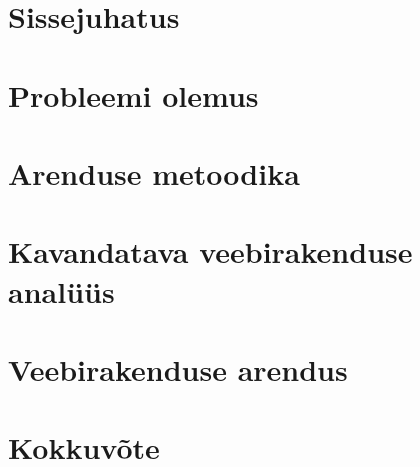 \chapter{Sissejuhatus}\label{chapter:introduction}


\chapter{Probleemi olemus}\label{chapter:problem_nature}


\chapter{Arenduse metoodika}\label{chapter:metodology}


\chapter{Kavandatava veebirakenduse analüüs}\label{chapter:analysis}


\chapter{Veebirakenduse arendus}\label{chapter:development}



\chapter{Kokkuvõte}\label{chapter:summary} 

